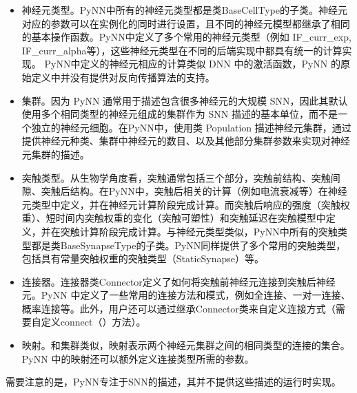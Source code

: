 \begin{itemize}
    \item 神经元类型。PyNN中所有的神经元类型都是类BaseCellType的子类。神经元对应的参数可以在实例化的同时进行设置，且不同的神经元模型都继承了相同的基本操作函数。PyNN中定义了多个常用的神经元类型（例如 IF\_curr\_exp, IF\_curr\_alpha等），这些神经元类型在不同的后端实现中都具有统一的计算实现。 PyNN中定义的神经元相应的计算类似 DNN 中的激活函数，PyNN 的原始定义中并没有提供对反向传播算法的支持。
    \item 集群。因为 PyNN 通常用于描述包含很多神经元的大规模 SNN，因此其默认使用多个相同类型的神经元组成的集群作为 SNN 描述的基本单位，而不是一个独立的神经元细胞。在PyNN中，使用类 Population 描述神经元集群，通过提供神经元种类、集群中神经元的数目、以及其他部分集群参数来实现对神经元集群的描述。
    \item 突触类型。从生物学角度看，突触通常包括三个部分，突触前结构、突触间隙、突触后结构。在PyNN中，突触后相关的计算（例如电流衰减等）在神经元类型中定义，并在神经元计算阶段完成计算。而突触后响应的强度（突触权重）、短时间内突触权重的变化（突触可塑性）和突触延迟在突触模型中定义，并在突触计算阶段完成计算。与神经元类型类似，PyNN中所有的突触类型都是类BaseSynapseType的子类。PyNN同样提供了多个常用的突触类型，包括具有常量突触权重的突触类型（StaticSynapse）等。 
    \item 连接器。连接器类Connector定义了如何将突触前神经元连接到突触后神经元。PyNN 中定义了一些常用的连接方法和模式，例如全连接、一对一连接、概率连接等。此外，用户还可以通过继承Connector类来自定义连接方式（需要自定义connect（）方法）。 
    \item 映射。和集群类似，映射表示两个神经元集群之间的相同类型的连接的集合。 PyNN 中的映射还可以额外定义连接类型所需的参数。
\end{itemize}

需要注意的是，PyNN专注于SNN的描述，其并不提供这些描述的运行时实现。

